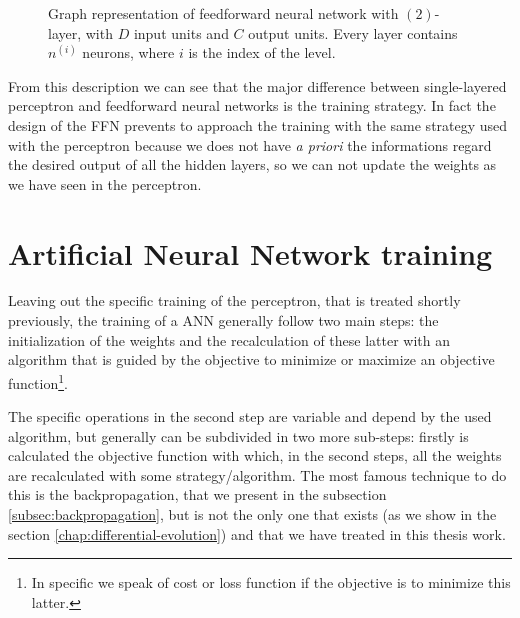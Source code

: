 \begin{figure}[t]
	\caption[Graph representation of feedforward neural network.]{Graph representation of feedforward neural network with $(2)$-layer, with $D$ input units and $C$ output units. Every layer contains $n^(i)$ neurons, where $i$ is the index of the level.}
	\label{fig:multilayer-perceptron}
\end{figure}

From this description we can see that the major difference between single-layered perceptron and feedforward neural networks is the training strategy. In fact the design of the FFN prevents to approach the training with the same strategy used with the perceptron because we does not have \textit{a priori} the informations regard the desired output of all the hidden layers, so we can not update the weights as we have seen in the perceptron.

\section{Artificial Neural Network training} 
Leaving out the specific training of the perceptron, that is treated shortly previously, the training of a ANN generally follow two main steps: the initialization of the weights and the recalculation of these latter with an algorithm that is guided by the objective to minimize or maximize an objective function\footnote{In specific we speak of cost or loss function if the objective is to minimize this latter.}.

The specific operations in the second step are variable and depend by the used algorithm, but generally can be subdivided in two more sub-steps: firstly is calculated the objective function with which, in the second steps, all the weights are recalculated with some strategy/algorithm. The most famous technique to do this is the backpropagation, that we present in the subsection \ref{subsec:backpropagation}, but is not the only one that exists (as we show in the section \ref{chap:differential-evolution}) and that we have treated in this thesis work.

